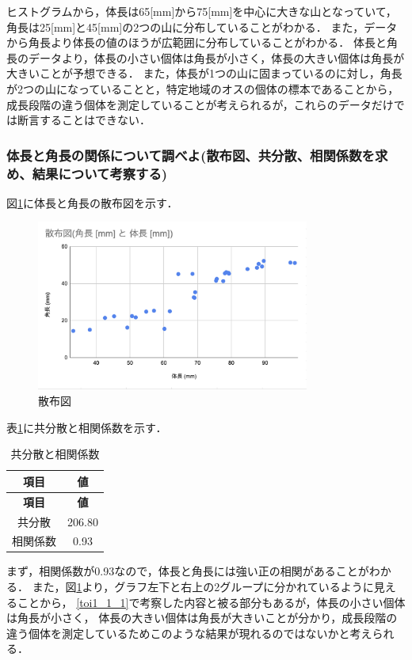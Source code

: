 \documentclass[titlepage,a4paper]{jsarticle}
\begin{document}
ヒストグラムから，体長は65[mm]から75[mm]を中心に大きな山となっていて，角長は25[mm]と45[mm]の2つの山に分布していることがわかる．
また，データから角長より体長の値のほうが広範囲に分布していることがわかる．
体長と角長のデータより，体長の小さい個体は角長が小さく，体長の大きい個体は角長が大きいことが予想できる．
また，体長が1つの山に固まっているのに対し，角長が2つの山になっていることと，特定地域のオスの個体の標本であることから，
成長段階の違う個体を測定していることが考えられるが，これらのデータだけでは断言することはできない．
\subsubsection{体長と角長の関係について調べよ(散布図、共分散、相関係数を求め、結果について考察する)}
図\ref{fig:sanp}に体長と角長の散布図を示す．
\begin{figure}[H]
  \centering
  \includegraphics[width=0.8\textwidth]{img/sanp.png}
  \caption{散布図}
  \label{fig:sanp}
\end{figure}

表\ref{tab:covariance_correlation}に共分散と相関係数を示す．
\begin{longtable}{|c|c|}
  \caption{共分散と相関係数} \label{tab:covariance_correlation} \\ \hline
  \textbf{項目} & \textbf{値}                              \\ \hline
  \endfirsthead
  \hline
  \textbf{項目} & \textbf{値}                              \\ \hline
  \endhead
  共分散         & 206.80                                  \\ \hline
  相関係数        & 0.93                                    \\ \hline
\end{longtable}

まず，相関係数が0.93なので，体長と角長には強い正の相関があることがわかる．
また，図\ref{fig:sanp}より，グラフ左下と右上の2グループに分かれているように見えることから，
\ref{toi1_1_1}で考察した内容と被る部分もあるが，体長の小さい個体は角長が小さく，
体長の大きい個体は角長が大きいことが分かり，成長段階の違う個体を測定しているためこのような結果が現れるのではないかと考えられる．
\end{document}
